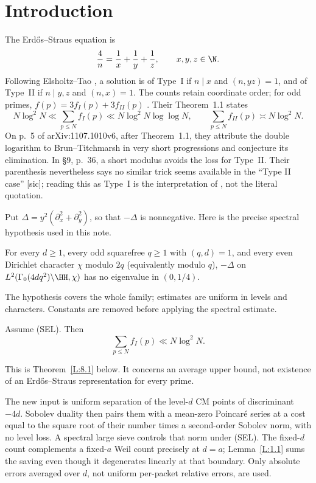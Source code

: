 \section{Introduction}\label{sec:intro}
The Erd\H{o}s--Straus equation is
\begin{equation}\label{A:eq:es}
 \frac4n=\frac1x+\frac1y+\frac1z,\qquad x,y,z\in\N.
\end{equation}
Following Elsholtz--Tao \cite{ET}, a solution is of Type~I if $n\mid x$ and
$(n,yz)=1$, and of Type~II if $n\mid y,z$ and $(n,x)=1$.
The counts retain coordinate order; for odd primes,
$f(p)=3f_I(p)+3f_{II}(p)$ \cite[(1.4)]{ET}.
Their Theorem~1.1 states
\begin{equation}\label{A:eq:et}
 N\log^2N\ll\sum_{p\le N}f_I(p)\ll N\log^2N\log\log N,
 \qquad \sum_{p\le N}f_{II}(p)\asymp N\log^2N.
\end{equation}
On p.~5 of arXiv:1107.1010v6, after Theorem~1.1, they attribute the double
logarithm to Brun--Titchmarsh in very short progressions and conjecture its
elimination. In \S9, p.~36, a short modulus avoids the loss for Type~II.
Their parenthesis nevertheless says no similar trick seems available in the
``Type II case'' [sic]; reading this as Type~I is the interpretation of
\cite[\S1]{MN3}, not the literal quotation.

Put $\Delta=y^2(\partial_x^2+\partial_y^2)$, so that $-\Delta$ is nonnegative.
Here is the precise spectral hypothesis used in this note.
\begin{hypothesis}[SEL]\label{hyp:sel}
For every $d\ge1$, every odd squarefree $q\ge1$ with $(q,d)=1$, and every
even Dirichlet character $\chi$ modulo $2q$ (equivalently modulo $q$),
$-\Delta$ on $L^2(\Gamma_0(4dq^2)\backslash\HH,\chi)$ has no eigenvalue in
$(0,1/4)$.
\end{hypothesis}
The hypothesis covers the whole family; estimates are uniform in levels
and characters. Constants are removed before applying the spectral estimate.
\begin{introthm}\label{thm:main}
Assume \textup{(SEL)}. Then
\[
 \sum_{p\le N}f_I(p)\ll N\log^2N.
\]
\end{introthm}
This is Theorem~\ref{L:8.1} below. It concerns an average upper bound, not
existence of an Erd\H{o}s--Straus representation for every prime.

The new input is uniform separation of the level-$d$ CM points of
discriminant $-4d$. Sobolev duality then pairs them with a mean-zero
Poincar\'e series at a cost equal to the square root of their number times
a second-order Sobolev norm, with no level loss. A spectral large sieve
controls that norm under (SEL). The fixed-$d$ count complements a
fixed-$a$ Weil count precisely at $d=a$; Lemma~\ref{L:1.1} sums the saving
even though it degenerates linearly at that boundary. Only absolute
errors averaged over $d$, not uniform per-packet relative errors, are used.

